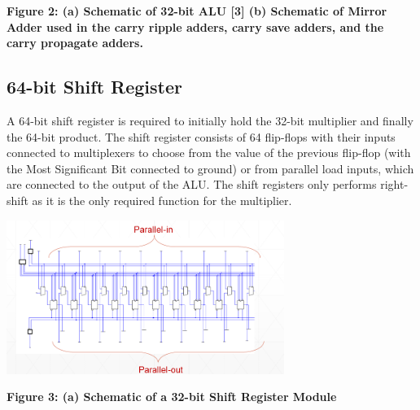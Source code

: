 \documentclass{report}
\begin{document}
 \begin{center}\bf Figure 2: (a) Schematic of 32-bit ALU [3] (b) Schematic of Mirror Adder used in the carry ripple adders, carry save adders, and the carry propagate adders. \end{center}
 \subsection*{64-bit Shift Register}
 A 64-bit shift register is required to initially hold the 32-bit multiplier and finally the 64-bit product.  The shift register consists of 64 flip-flops with their inputs connected to multiplexers to choose from the value of the previous flip-flop (with the Most Significant Bit connected to ground) or from parallel load inputs, which are connected to the output of the ALU. The shift registers only performs right-shift as it is the only required function for the multiplier.
  \begin{center} \includegraphics[height=5cm]{shift_schem.png}	\end{center}
  \begin{center}\bf Figure 3: (a) Schematic of a 32-bit Shift Register Module\end{center}
\end{document}

